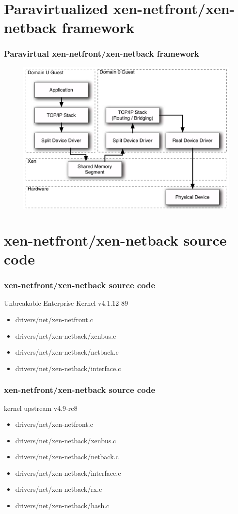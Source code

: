 \documentclass[aspectratio=169]{beamer}
\begin{document}
\section{Paravirtualized xen-netfront/xen-netback framework}
\begin{frame}
\frametitle{Paravirtual xen-netfront/xen-netback framework}
\begin{figure}
\includegraphics[width=0.7\linewidth]{figures/xennet1.pdf}
\end{figure}
\end{frame}


\section{xen-netfront/xen-netback source code}
\begin{frame}
\frametitle{xen-netfront/xen-netback source code}
\begin{block}{Unbreakable Enterprise Kernel v4.1.12-89}
\begin{itemize}
\item drivers/net/xen-netfront.c
\item drivers/net/xen-netback/xenbus.c
\item drivers/net/xen-netback/netback.c
\item drivers/net/xen-netback/interface.c
\end{itemize}
\end{block}
\frametitle{xen-netfront/xen-netback source code}
\begin{block}{kernel upstream v4.9-rc8}
\begin{itemize}
\item drivers/net/xen-netfront.c
\item drivers/net/xen-netback/xenbus.c
\item drivers/net/xen-netback/netback.c
\item drivers/net/xen-netback/interface.c
\item drivers/net/xen-netback/rx.c
\item drivers/net/xen-netback/hash.c
\end{itemize}
\end{block}
\end{frame}
\end{document}
